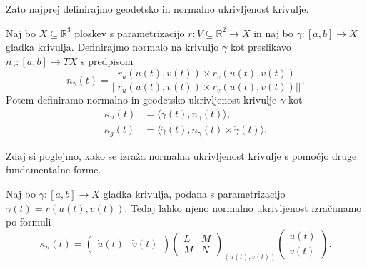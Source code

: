 Zato najprej definirajmo geodetsko in normalno ukrivljenost krivulje.

\begin{definicija}
\label{def_geodetska_in_normalna_ukrivljenost}
Naj bo $X \subseteq \mathbb{R}^3$ ploskev s parametrizacijo $r: V \subseteq \mathbb{R}^2 \to  X$ in naj bo $\gamma: [a,b] \to X$ gladka krivulja. 
Definirajmo normalo na krivuljo $\gamma$ kot preslikavo $n_{\gamma}: [a,b] \to  TX$ s predpisom
\begin{equation*} n_{\gamma}(t) = \frac{r_u(u(t), v(t)) \times  r_v(u(t), v(t))}{\lvert\lvert r_u(u(t), v(t)) \times  r_v(u(t), v(t)) \rvert\rvert }.\end{equation*}
Potem definiramo normalno in geodetsko ukrivljenost krivulje $\gamma$ kot 
\begin{align*}
    \kappa_n(t) &= \langle \ddot{\gamma}(t), n_{\gamma}(t) \rangle,  \\
    \kappa_g(t) &= \langle \ddot{\gamma}(t),  n_{\gamma}(t)  \times \dot{\gamma}(t) \rangle.
\end{align*}

\end{definicija}

Zdaj si poglejmo, kako se izraža normalna ukrivljenost krivulje s pomočjo druge fundamentalne forme.

\begin{izrek}
\label{izr_izrazava_normalne_ukrivljenosti_z_drugo_fundamentalno_formo}
  Naj bo $\gamma: [a,b] \to X$ gladka krivulja, podana s parametrizacijo $\gamma(t) = r(u(t), v(t))$. Tedaj lahko njeno normalno ukrivljenost
  izračunamo po formuli 
  \begin{equation*} \kappa_n(t) = \begin{pmatrix}
    \dot{u}(t) & \dot{v}(t) 
  \end{pmatrix}  
  \begin{pmatrix}
    L & M \\
    M & N
  \end{pmatrix}_{(u(t), v(t))}  
  \begin{pmatrix}
    \dot{u}(t) \\
    \dot{v}(t) 
  \end{pmatrix}.  \end{equation*}
\end{izrek}

